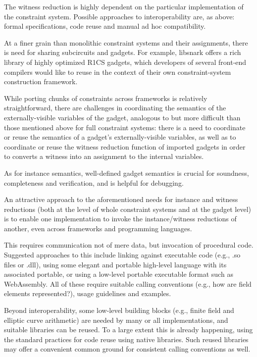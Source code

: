 \documentclass[a4paper,11pt]{article}
\begin{document}
The witness reduction is highly dependent on the particular implementation of the constraint system. Possible approaches to interoperability are, as above: formal specifications, code reuse and manual ad hoc compatibility.

At a finer grain than monolithic constraint systems and their assignments, there is need for sharing subcircuits and gadgets. For example, libsnark offers a rich library of highly optimized R1CS gadgets, which developers of several front-end compilers would like to reuse in the context of their own constraint-system construction framework.

While porting chunks of constraints across frameworks is relatively straightforward, there are challenges in coordinating the semantics of the externally-visible variables of the gadget, analogous to but more difficult than those mentioned above for full constraint systems: there is a need to coordinate or reuse the semantics of a gadget’s externally-visible variables, as well as to coordinate or reuse the witness reduction function of imported gadgets in order to converts a witness into an assignment to the internal variables.

As for instance semantics, well-defined gadget semantics is crucial for soundness, completeness and verification, and is helpful for debugging.

An attractive approach to the aforementioned needs for instance and witness reductions (both at the level of whole constraint systems and at the gadget level) is to enable one implementation to invoke the instance/witness reductions of another, even across frameworks and programming languages.

This requires communication not of mere data, but invocation of procedural code. Suggested approaches to this include linking against executable code (e.g., .so files or .dll), using some elegant and portable high-level language with its associated portable, or using a low-level portable executable format such as WebAssembly. All of these require suitable calling conventions (e.g., how are field elements represented?), usage guidelines and examples.

Beyond interoperability, some low-level building blocks (e.g., finite field and elliptic curve arithmetic) are needed by many or all implementations, and suitable libraries can be reused. To a large extent this is already happening, using the standard practices for code reuse using native libraries. Such reused libraries may offer a convenient common ground for consistent calling conventions as well.
\end{document}
